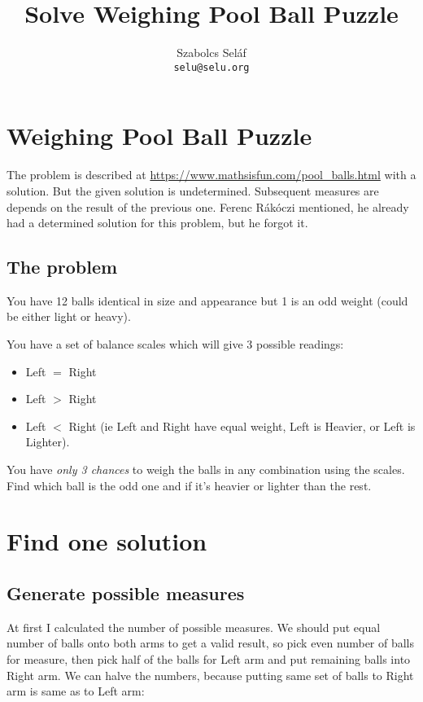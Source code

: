 \documentclass[11pt]{article} %
\title{Solve Weighing Pool Ball Puzzle}
\author{Szabolcs Seláf \\ \texttt{selu@selu.org}}
\begin{document}
\maketitle

\section{Weighing Pool Ball Puzzle}

The problem is described at \url{https://www.mathsisfun.com/pool_balls.html} with a solution. But the given solution is undetermined. Subsequent measures are depends on the result of the previous one. Ferenc Rákóczi mentioned, he already had a determined solution for this problem, but he forgot it.

\subsection{The problem}

You have 12 balls identical in size and appearance but 1 is an odd weight (could be either light or heavy).

You have a set of balance scales which will give 3 possible readings:

\begin{itemize}
\item Left $=$ Right
\item Left $>$ Right
\item Left $<$ Right (ie Left and Right have equal weight, Left is Heavier, or Left is Lighter).
\end{itemize}

You have \emph{only 3 chances} to weigh the balls in any combination using the scales.
Find which ball is the odd one and if it's heavier or lighter than the rest.

\section{Find one solution}

\subsection{Generate possible measures}
At first I calculated the number of possible measures. We should put equal number of balls onto both arms to get a valid result, so pick even number of balls for measure, then pick half of the balls for Left arm and put remaining balls into Right arm. We can halve the numbers, because putting same set of balls to Right arm is same as to Left arm:
\end{document}
